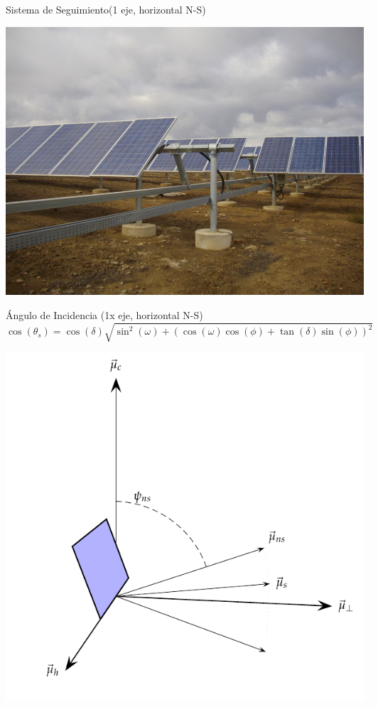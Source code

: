 \documentclass[xcolor={usenames,svgnames,dvipsnames}]{beamer}
\begin{document}
\begin{frame}[label={sec:org9dc625d}]{Sistema de Seguimiento(1 eje, horizontal N-S)}
\begin{center}
\includegraphics[width=.9\linewidth]{../figs/SeguidorEjeHorizontal.jpg}
\end{center}
\end{frame}


\begin{frame}[plain,label={sec:org1b2231c}]{Ángulo de Incidencia (1x eje, horizontal N-S)}
\[\cos(\theta_{s})=\cos(\delta)\sqrt{\sin^{2}(\omega)+\left(\cos(\omega)\cos(\phi)+\tan(\delta)\sin(\phi)\right)^{2}}\]

\begin{center}
\includegraphics[height=0.6\textheight]{../figs/AngulosSistemaHorizontalNS.pdf}
\end{center}
\end{frame}
\end{document}
